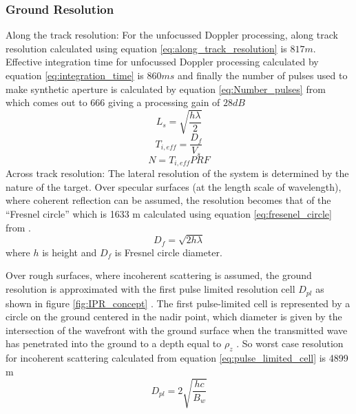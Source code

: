 \subsubsection{Ground Resolution}
Along the track resolution:
For the unfocussed Doppler processing, along track resolution calculated using equation \ref{eq:along_track_resolution} is $817 m$. Effective integration time for unfocussed Doppler processing calculated by equation \ref{eq:integration_time} is $860 ms$ and finally the number of pulses used to make synthetic aperture is calculated by equation \ref{eq:Number_pulses} from \cite{Gany_SRS}  which comes out to 666 giving a processing gain of $28 dB$ 
%
\begin{equation}
L_{s} = \sqrt{\dfrac{h\lambda}{2}}
\label{eq:along_track_resolution}
\end{equation}
%
\begin{equation}
T_{i,eff} = \dfrac{D_{f}}{V_{s}}
\label{eq:integration_time}
\end{equation}
\begin{equation}
N = T_{i,eff}PRF 
\label{eq:Number_pulses}
\end{equation}
Across track resolution: The lateral resolution of the system is determined by the nature of the target.
Over specular surfaces (at the length scale of wavelength), where coherent reflection can be assumed, the resolution becomes that of the ``Fresnel circle'' which is 1633 m calculated using equation \ref{eq:fresenel_circle} from \cite{SHARAD}.
\begin{equation}
D_{f} = \sqrt{2h\lambda}
\label{eq:fresenel_circle}
\end{equation}
where $h$ is height and $D_{f}$ is Fresnel circle diameter.

Over rough surfaces, where incoherent scattering is assumed, the ground resolution is approximated with the first pulse limited resolution cell $D_{pl}$ as shown in figure \ref{fig:IPR_concept} . The first pulse-limited cell is represented by a circle on the ground centered in the nadir point, which diameter is given by the intersection of the wavefront with the ground surface when the transmitted wave has penetrated into the ground to a depth equal to $\rho_{z}$ \cite{Gany_SRS}. So worst case resolution for incoherent scattering calculated from equation \ref{eq:pulse_limited_cell} is 4899 m 
\begin{equation}
D_{pl} = 2\sqrt{\dfrac{hc}{B_{w}}}
\label{eq:pulse_limited_cell}
\end{equation}